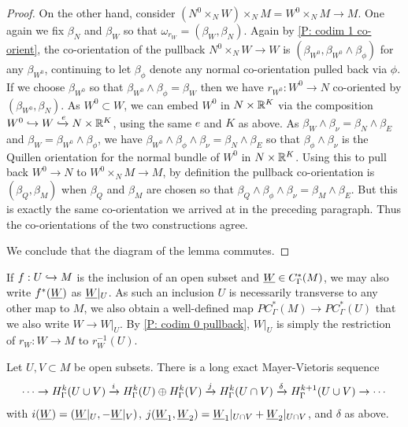 \begin{proof}
On the other hand, consider $(N^0\times_N W)\times_N M = W^0\times_NM \to M$. One again we fix $\beta_N$ and $\beta_W$ so that $\omega_{r_W} = (\beta_W,\beta_N)$. Again by \cref{P: codim 1 co-orient}, the co-orientation of the pullback $N^0\times_N W \to W$ is $(\beta_{W^0},\beta_{W^0} \wedge \beta_\phi)$ for any $\beta_{W^0}$, continuing to let $\beta_\phi$ denote any normal co-orientation pulled back via $\phi$. If we choose $\beta_{W^0}$ so that $\beta_{W^0} \wedge \beta_\phi = \beta_W$ then we have $r_{W^0} \colon W^0 \to N$ co-oriented by $(\beta_{W^0},\beta_N)$. As $W^0 \subset W$, we can embed $W^0$ in $N \times \mathbb{R}^K$ via the composition $W^0 \hookrightarrow W \xhookrightarrow{e}N \times \mathbb{R}^K$, using the same $e$ and $K$ as above. As $\beta_W \wedge \beta_\nu = \beta_N \wedge \beta_E$ and $\beta_W = \beta_{W^0} \wedge \beta_\phi$, we have $\beta_{W^0} \wedge \beta_\phi \wedge \beta_\nu = \beta_N \wedge \beta_E$ so that $\beta_\phi \wedge \beta_\nu$ is the Quillen orientation for the normal bundle of $W^0$ in $N \times \mathbb{R}^K$. Using this to pull back $W^0 \to N$ to $W^0\times_NM \to M$, by definition the pullback co-orientation is $(\beta_Q,\beta_M)$ when $\beta_Q$ and $\beta_M$ are chosen so that $\beta_Q \wedge \beta_\phi \wedge \beta_\nu = \beta_M \wedge \beta_E$. But this is exactly the same co-orientation we arrived at in the preceding paragraph. Thus the co-orientations of the two constructions agree.


We conclude that the diagram of the lemma commutes.
\end{proof}


\begin{notation}
If $f: U \hookrightarrow M$ is the inclusion of an open subset and $\underline{W} \in C^*_\Gamma(M)$, we may also write $f^*(\underline{W})$ as $\underline{W}|_U$. As such an inclusion $U$ is necessarily transverse to any other map to $M$, we also obtain a well-defined map $PC^*_\Gamma(M) \to PC^*_\Gamma(U)$ that we also write $W \to W|_U$. By \cref{P: codim 0 pullback}, $W|_U$ is simply the restriction of $r_W \colon W \to M$ to $r_W^{-1}(U)$.
\end{notation}

\begin{theorem}\label{T: absolute MV}
Let $U,V \subset M$ be open subsets. There is a long exact Mayer-Vietoris sequence
$$\cdots \to H^k_\Gamma(U \cup V) \xrightarrow{i} H^k_\Gamma(U) \oplus H^k_\Gamma(V) \xrightarrow{j} H^k_\Gamma(U \cap V) \xrightarrow{\delta} H^{k+1}_\Gamma(U \cup V)\to\cdots$$
with $i(\underline{W}) = (\underline{W}|_U, -\underline{W}|_V)$, $j(\underline{W}_1,\underline{W}_2) = \underline{W}_1|_{U \cap V}+\underline{W}_2|_{U \cap V}$, and $\delta$ as above.
\end{theorem}



